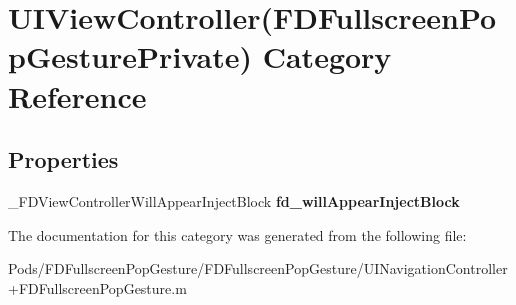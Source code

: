 \hypertarget{category_u_i_view_controller_07_f_d_fullscreen_pop_gesture_private_08}{}\section{U\+I\+View\+Controller(F\+D\+Fullscreen\+Pop\+Gesture\+Private) Category Reference}
\label{category_u_i_view_controller_07_f_d_fullscreen_pop_gesture_private_08}
\subsection*{Properties}
\begin{DoxyCompactItemize}
\item 
\mbox{\label{category_u_i_view_controller_07_f_d_fullscreen_pop_gesture_private_08_af0070a852cf51421a8d9291bef8ce727}} 
\+\_\+\+F\+D\+View\+Controller\+Will\+Appear\+Inject\+Block {\bfseries fd\+\_\+will\+Appear\+Inject\+Block}
\end{DoxyCompactItemize}


The documentation for this category was generated from the following file\+:\begin{DoxyCompactItemize}
\item 
Pods/\+F\+D\+Fullscreen\+Pop\+Gesture/\+F\+D\+Fullscreen\+Pop\+Gesture/U\+I\+Navigation\+Controller+\+F\+D\+Fullscreen\+Pop\+Gesture.\+m\end{DoxyCompactItemize}

